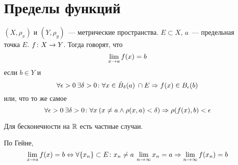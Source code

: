 ﻿\section{Пределы функций}

\begin{Def}
$(X, \rho_x)$ и $(Y, \rho_y)$~--- метрические пространства. $E \subset X$, $a$~--- предельная точка $E$. $f\colon X \rightarrow Y$.
Тогда говорят, что
$$\lim_{x \rightarrow a} f(x) = b$$
если $b \in Y$ и
$$\forall \epsilon>0\: \exists \delta > 0\colon \forall x \in \dot B_\delta(a)\: \cap E \Rightarrow f(x) \in B_\epsilon (b)$$
или, что то же самое
$$\forall \epsilon>0\: \exists \delta > 0\colon \forall x\: (x \ne a \land \rho(x, a) < \delta) \Rightarrow \rho(f(x), b) < \epsilon$$
\end{Def}

\begin{Rem}
Для бесконечности на $\mathbb{R}$ есть частные случаи.
\end{Rem}

\begin{Def}
По Гейне,
$$\lim_{x \rightarrow a} f(x) = b \Leftrightarrow \forall \{x_n\}\subset E\colon x_n \ne a\: \lim_{n\rightarrow \infty} x_n = a \Rightarrow \lim_{n \rightarrow \infty} f(x_n) = b$$
\end{Def}

